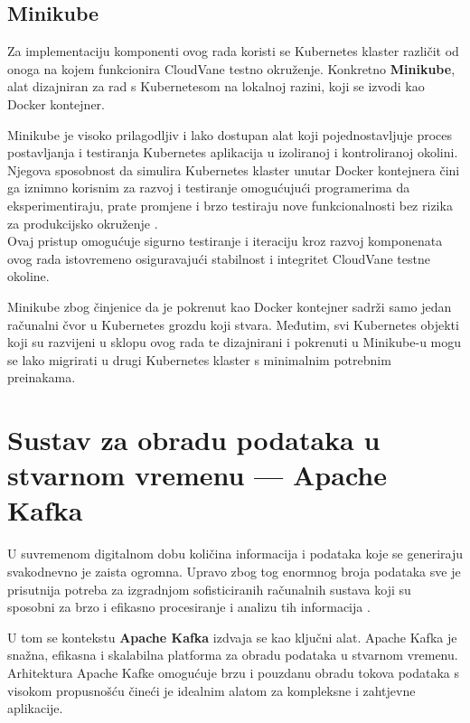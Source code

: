 \documentclass[times, utf8, diplomski]{fer}
\begin{document}
\clearpage
\subsection{Minikube}
\label{sec:minikube}

Za implementaciju komponenti ovog rada koristi se Kubernetes klaster različit od onoga na kojem funkcionira CloudVane testno okruženje. Konkretno \textbf{Minikube}, alat dizajniran za rad s Kubernetesom na lokalnoj razini, koji se izvodi kao Docker kontejner.

Minikube je visoko prilagodljiv i lako dostupan alat koji pojednostavljuje proces postavljanja i testiranja Kubernetes aplikacija u izoliranoj i kontroliranoj okolini. Njegova sposobnost da simulira Kubernetes klaster unutar Docker kontejnera čini ga iznimno korisnim za razvoj i testiranje omogućujući programerima da eksperimentiraju, prate promjene i brzo testiraju nove funkcionalnosti bez rizika za produkcijsko okruženje \citep{luksa_kubernetes_2023}. \\

Ovaj pristup omogućuje sigurno testiranje i iteraciju kroz razvoj komponenata ovog rada istovremeno osiguravajući stabilnost i integritet CloudVane testne okoline. 

Minikube zbog činjenice da je pokrenut kao Docker kontejner sadrži samo jedan računalni čvor u Kubernetes grozdu koji stvara. Međutim, svi Kubernetes objekti koji su razvijeni u sklopu ovog rada te dizajnirani i pokrenuti u Minikube-u mogu se lako migrirati u drugi Kubernetes klaster s minimalnim potrebnim preinakama.

\clearpage
\section{Sustav za obradu podataka u stvarnom vremenu --- Apache Kafka}
\label{sec:kafka}

U suvremenom digitalnom dobu količina informacija i podataka koje se generiraju svakodnevno je zaista ogromna. Upravo zbog tog enormnog broja podataka sve je prisutnija potreba za izgradnjom sofisticiranih računalnih sustava koji su sposobni za brzo i efikasno procesiranje i analizu tih informacija \citep{cubek_apache_2022}.

U tom se kontekstu \textbf{Apache Kafka} izdvaja se kao ključni alat. Apache Kafka je snažna, efikasna i skalabilna platforma za obradu podataka u stvarnom vremenu. Arhitektura Apache Kafke omogućuje brzu i pouzdanu obradu tokova podataka s visokom propusnošću čineći je idealnim alatom za kompleksne i zahtjevne aplikacije. 
\end{document}
